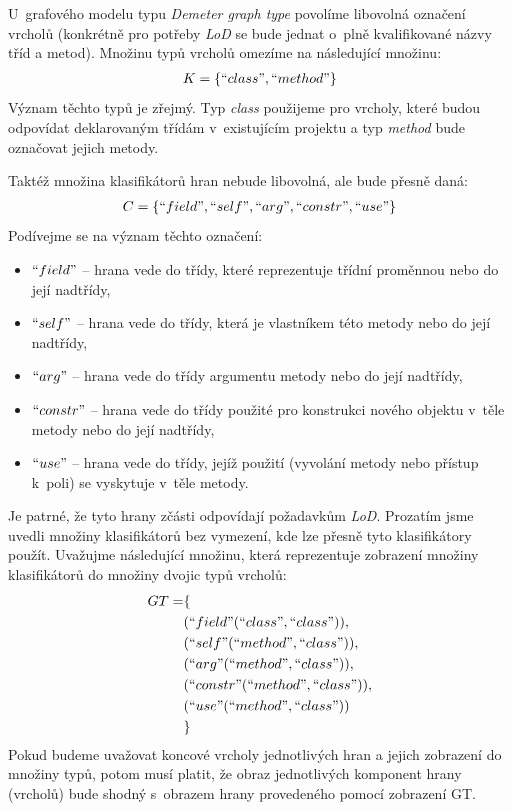 U~grafového modelu typu \emph{Demeter graph type} povolíme libovolná označení vrcholů (konkrétně pro potřeby \emph{LoD} se bude jednat o~plně kvalifikované názvy tříd a metod). Množinu typů vrcholů omezíme na následující množinu:
\begin{align*}
K = \{ ``class", ``method" \}
\end{align*}
Význam těchto typů je zřejmý. Typ \emph{class} použijeme pro vrcholy, které budou odpovídat deklarovaným třídám v~existujícím projektu a typ \emph{method} bude označovat jejich metody.

Taktéž množina klasifikátorů hran nebude libovolná, ale bude přesně daná:
\begin{align*}
C = \{ ``field", ``self", ``arg", ``constr", ``use" \}
\end{align*}
Podívejme se na význam těchto označení:
\begin{itemize}
\item $``field"$ -- hrana vede do třídy, které reprezentuje třídní proměnnou nebo do její nadtřídy,
\item $``self"$ -- hrana vede do třídy, která je vlastníkem této metody nebo do její nadtřídy,
\item $``arg"$ -- hrana vede do třídy argumentu metody nebo do její nadtřídy,
\item $``constr"$ -- hrana vede do třídy použité pro konstrukci nového objektu v~těle metody nebo do její nadtřídy,
\item $``use"$ -- hrana vede do třídy, jejíž použití (vyvolání metody nebo přístup k~poli) se vyskytuje v~těle metody.
\end{itemize}
Je patrné, že tyto hrany zčásti odpovídají požadavkům \emph{LoD}. Prozatím jsme uvedli množiny klasifikátorů bez vymezení, kde lze přesně tyto klasifikátory použít. Uvažujme následující množinu, která reprezentuje zobrazení množiny klasifikátorů do množiny dvojic typů vrcholů:
\begin{align*}
GT = &\{ \\
&(``field" (``class", ``class")), \\
&(``self" (``method", ``class")), \\
&(``arg" (``method", ``class")), \\
&(``constr" (``method", ``class")), \\
&(``use" (``method", ``class")) \\
&\}
\end{align*}
Pokud budeme uvažovat koncové vrcholy jednotlivých hran a jejich zobrazení do množiny typů, potom musí platit, že obraz jednotlivých komponent hrany (vrcholů) bude shodný s~obrazem hrany provedeného pomocí zobrazení GT.

